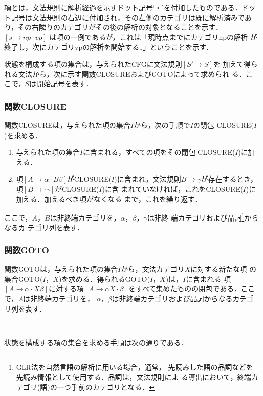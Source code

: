 項とは，文法規則に解析経過を示すドット記号`・'を付加したものである．ドッ
ト記号は文法規則の右辺に付加され，その左側のカテゴリは既に解析済みであ
り，その右隣りのカテゴリがその後の解析の対象となることを示す．$[s \to
np \cdot vp]$ は項の一例であるが，これは「現時点までにカテゴリnpの解析
が終了し，次にカテゴリvpの解析を開始する．」ということを示す．

状態を構成する項の集合は，与えられたCFGに文法規則$[S' \to S]$を
加えて得られる文法から，次に示す関数CLOSUREおよびGOTOによって求められ
る．ここで，$S$は開始記号を表す．

\subsubsection*{関数CLOSURE}

関数CLOSUREは，与えられた項の集合$I$から，次の手順で$I$の閉包
CLOSURE($I$)を求める．

\begin{enumerate}
\item 与えられた項の集合$I$に含まれる，すべての項をその閉包
  CLOSURE($I$)に加える．
\item 項$[A \to \alpha \cdot B \beta]$がCLOSURE($I$)に含まれ，文法規則$B
  \to \gamma$が存在するとき，項$[B \to \cdot \gamma]$がCLOSURE($I$)に含
  まれていなければ，これをCLOSURE($I$)に加える．加えるべき項がなくなる
  まで，これを繰り返す．
\end{enumerate}

ここで，$A$，$B$は非終端カテゴリを，$\alpha$，$\beta$，$\gamma$は非終
端カテゴリおよび品詞\footnote{GLR法を自然言語の解析に用いる場合，通常，
先読みした語の品詞などを先読み情報として使用する．品詞は，文法規則によ
る導出において，終端カテゴリ(語)の一つ手前のカテゴリとなる．}からなるカ
テゴリ列を表す．

\subsubsection*{関数GOTO}

関数GOTOは，与えられた項の集合$I$から，文法カテゴリ$X$に対する新たな項
の集合GOTO($I$，$X$)を求める．得られるGOTO($I$，$X$)は，$I$に含まれる
項$[A \to \alpha \cdot X \beta]$に対する項$[A \to \alpha X \cdot
\beta]$をすべて集めたものの閉包である．ここで，$A$は非終端カテゴリを，
$\alpha$，$\beta$は非終端カテゴリおよび品詞からなるカテゴリ列を表す．

\ 

状態を構成する項の集合を求める手順は次の通りである．

